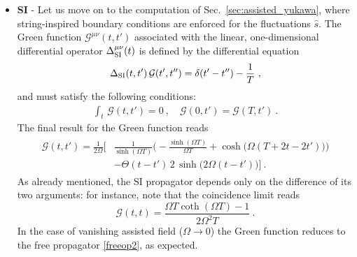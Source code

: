 \documentclass[12pt,a4paper]{article}
\numberwithin{equation}{section}
\numberwithin{equation}{section}
\begin{document}
\begin{itemize}
 \item \textbf{SI} - Let us move on to the computation of Sec.~\ref{sec:assisted_yukawa}, where string-inspired boundary conditions are enforced for the fluctuations $\hat{s}$. The Green function $\mathcal{G}^{\mu\nu}(t,t')$ associated with the linear, one-dimensional differential operator $\Delta^{\mu\nu}_{\rm SI}(t)$ is defined by the differential equation
\begin{equation}
\Delta_{\rm SI}(t,t') \, \mathcal{G}(t',t'')=\delta(t'-t'')-\frac{1}{T}\ ,
\end{equation}
and must satisfy the following conditions:
\begin{align} \label{A.33}
 \int_t \, \mathcal{G}(t,t')=0\ , \quad \mathcal{G}(0,t')= \mathcal{G}(T,t')\ .
 \end{align}
The final result for the Green function reads
\begin{align}
\begin{split}
\mathcal{G} (t,t')=\frac{1}{2\Omega} \bigg[&\frac{1}{\sinh({\Omega T})}\bigg(- \frac{\sinh(\Omega T)}{\Omega T}+\cosh\Big( \Omega(T+2t-2t' ) \Big) \bigg) 
\\
&-\Theta(t-t') \,2\,\sinh \Big({2\Omega (t-t')} \Big) \bigg]\ .
\end{split}
\end{align}
As already mentioned, the SI propagator depends only on the difference of its two arguments: for instance, note that the coincidence limit reads
\begin{equation}
\mathcal{G} (t,t)=\frac{\Omega T \coth{(\Omega T)}-1}{2\Omega^2 T}\ .
\end{equation}
In the case of vanishing assisted field ($\Omega \to 0$) the Green function reduces to the free propagator \eqref{freeop2}, as expected. 
\end{itemize}


\end{document}
